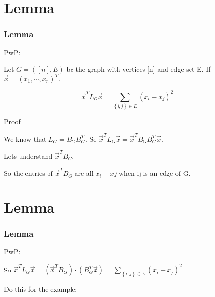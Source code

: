 \documentclass{beamer}
\begin{document}
\section{Lemma}
\begin{frame}
\frametitle{\textbf{Lemma} }
PwP: \vspace{0.2 cm}

Let $G=\left([n], E\right)$ be the graph with vertices [n] and edge set E. If $\vec{x}=\left(x_1, \cdots , x_n\right)^T$. \vspace{0.2 cm}

\begin{equation*}
    \vec{x}^{T}L_{G}\vec{x} = \sum_{\left\{i,j\right\} \in E}\left(x_{i}-x_{j}\right)^2
\end{equation*}

Proof \vspace{0.2 cm}

We know that $L_{G}=B_{G}B_{G}^{T}$. So $\vec{x}^{T}L_{G}\vec{x} = \vec{x}^{T}B_{G}B_{G}^{T}\vec{x}$. \vspace{0.2 cm}

Lets understand $\vec{x}^{T}B_{G}$.\vspace{0.2 cm}


So the entries of $\vec{x}^{T}B_{G}$ are all $x_{i}-x{j}$ when ij is an edge of G.

\end{frame}


\section{Lemma}
\begin{frame}
\frametitle{\textbf{Lemma} }
PwP: \vspace{0.2 cm}

So $\vec{x}^{T}L_{G}\vec{x} = \left(\vec{x}^{T}B_{G}\right) \cdot \left(B_{G}^{T}\vec{x}\right) = \sum_{\left\{i,j\right\} \in E}\left(x_{i}-x_{j}\right)^2$. \vspace{0.2 cm}

Do this for the example:

\end{frame}
\end{document}

